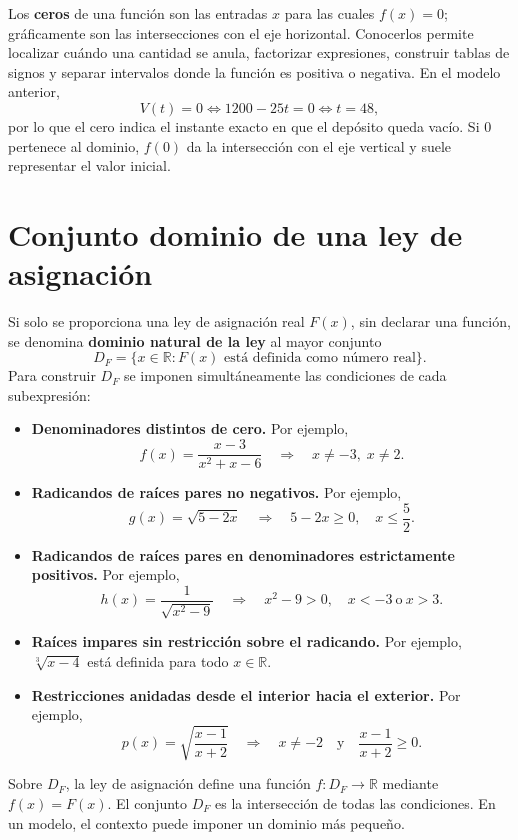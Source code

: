 Los \textbf{ceros} de una función son las entradas $x$ para las cuales $f(x)=0$; gráficamente son las intersecciones con el eje horizontal. Conocerlos permite localizar cuándo una cantidad se anula, factorizar expresiones, construir tablas de signos y separar intervalos donde la función es positiva o negativa. En el modelo anterior,
\[
V(t)=0\iff1200-25t=0\iff t=48,
\]
por lo que el cero indica el instante exacto en que el depósito queda vacío. Si $0$ pertenece al dominio, $f(0)$ da la intersección con el eje vertical y suele representar el valor inicial.

\section*{Conjunto dominio de una ley de asignación}

\begin{proposicion}
Si solo se proporciona una ley de asignación real $F(x)$, sin declarar una función, se denomina \textbf{dominio natural de la ley} al mayor conjunto
\[
D_F=\{x\in\mathbb{R}:F(x)\text{ está definida como número real}\}.
\]
Para construir $D_F$ se imponen simultáneamente las condiciones de cada subexpresión:
\begin{itemize}
  \item \textbf{Denominadores distintos de cero.} Por ejemplo,
  \[
  f(x)=\frac{x-3}{x^2+x-6}
  \quad\Longrightarrow\quad x\neq-3,\;x\neq2.
  \]
  \item \textbf{Radicandos de raíces pares no negativos.} Por ejemplo,
  \[
  g(x)=\sqrt{5-2x}
  \quad\Longrightarrow\quad 5-2x\geq0,
  \quad x\leq\frac52.
  \]
  \item \textbf{Radicandos de raíces pares en denominadores estrictamente positivos.} Por ejemplo,
  \[
  h(x)=\frac{1}{\sqrt{x^2-9}}
  \quad\Longrightarrow\quad x^2-9>0,
  \quad x<-3\ \text{o}\ x>3.
  \]
  \item \textbf{Raíces impares sin restricción sobre el radicando.} Por ejemplo, $\sqrt[3]{x-4}$ está definida para todo $x\in\mathbb{R}$.
  \item \textbf{Restricciones anidadas desde el interior hacia el exterior.} Por ejemplo,
  \[
  p(x)=\sqrt{\frac{x-1}{x+2}}
  \quad\Longrightarrow\quad x\neq-2
  \quad\text{y}\quad\frac{x-1}{x+2}\geq0.
  \]
\end{itemize}
Sobre $D_F$, la ley de asignación define una función $f:D_F\to\mathbb{R}$ mediante $f(x)=F(x)$. El conjunto $D_F$ es la intersección de todas las condiciones. En un modelo, el contexto puede imponer un dominio más pequeño.
\end{proposicion}

